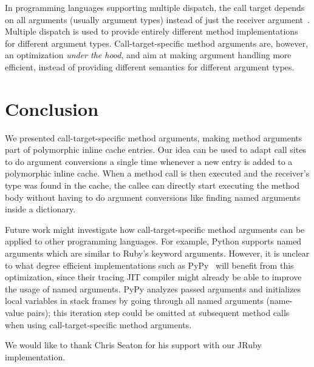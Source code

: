 \documentclass[10pt]{sigplanconf}
\begin{document}
In programming languages supporting multiple dispatch, the call target depends on all arguments (usually argument types) instead of just the receiver argument~\cite{multimethods}. Multiple dispatch is used to provide entirely different method implementations for different argument types. Call-target-specific method arguments are, however, an optimization \emph{under the hood}, and aim at making argument handling more efficient, instead of providing different semantics for different argument types.

\section{Conclusion}
We presented call-target-specific method arguments, making method arguments part of polymorphic inline cache entries. Our idea can be used to adapt call sites to do argument conversions a single time whenever a new entry is added to a polymorphic inline cache. When a method call is then executed and the receiver's type was found in the cache, the callee can directly start executing the method body without having to do argument conversions like finding named arguments inside a dictionary.

Future work might investigate how call-target-specific method arguments can be applied to other programming languages. For example, Python supports named arguments which are similar to Ruby's keyword arguments. However, it is unclear to what degree efficient implementations such as PyPy~\cite{Bolz:2009:TMP:1565824.1565827} will benefit from this optimization, since their tracing JIT compiler might already be able to improve the usage of named arguments. PyPy analyzes passed arguments and initializes local variables in stack frames by going through all named arguments (name-value pairs); this iteration step could be omitted at subsequent method calls when using call-target-specific method arguments.

\acks
We would like to thank Chris Seaton for his support with our JRuby implementation.

%

%
%
\end{document}
